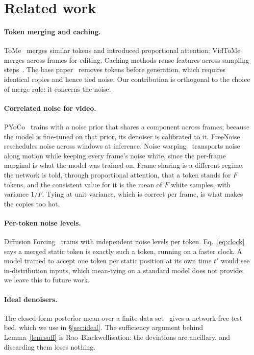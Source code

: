 \section{Related work}
\label{sec:related}

\paragraph{Token merging and caching.}
ToMe~\cite{bolya2023tome,bolya2023tomesd} merges similar tokens and introduced proportional attention; VidToMe~\cite{li2024vidtome} merges across frames for editing.
Caching methods reuse features across sampling steps~\cite{zhao2025pab,liu2025teacache}.
The base paper~\cite{garlapati2026ecm} removes tokens before generation, which requires identical copies and hence tied noise.
Our contribution is orthogonal to the choice of merge rule: it concerns the noise.

\paragraph{Correlated noise for video.}
PYoCo~\cite{ge2023pyoco} trains with a noise prior that shares a component across frames; because the model is fine-tuned on that prior, its denoiser is calibrated to it.
FreeNoise~\cite{qiu2024freenoise} reschedules noise across windows at inference.
Noise warping~\cite{chang2024warped,burgert2025gowiththeflow} transports noise along motion while keeping every frame's noise white, since the per-frame marginal is what the model was trained on.
Frame sharing is a different regime: the network is told, through proportional attention, that a token stands for $F$ tokens, and the consistent value for it is the mean of $F$ white samples, with variance $1/F$.
Tying at unit variance, which is correct per frame, is what makes the copies too hot.

\paragraph{Per-token noise levels.}
Diffusion Forcing~\cite{chen2024diffusionforcing} trains with independent noise levels per token.
Eq.~\ref{eq:clock} says a merged static token is exactly such a token, running on a faster clock.
A model trained to accept one token per static position at its own time $t'$ would see in-distribution inputs, which mean-tying on a standard model does not provide; we leave this to future work.

\paragraph{Ideal denoisers.}
The closed-form posterior mean over a finite data set~\cite{karras2022edm} gives a network-free test bed, which we use in \S\ref{sec:ideal}.
The sufficiency argument behind Lemma~\ref{lem:suff} is Rao--Blackwellisation: the deviations are ancillary, and discarding them loses nothing.
